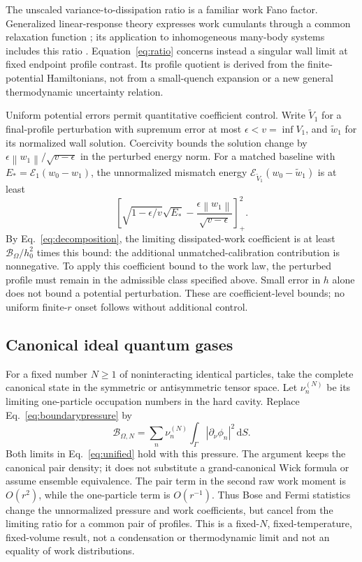 \documentclass[aps,pra,reprint,superscriptaddress,longbibliography]{revtex4-2}
\newcommand{\dd}{\mathrm d}
\newcommand{\calE}{\mathcal E}
\newcommand{\calB}{\mathcal B}
\newcommand{\norm}[1]{\left\lVert#1\right\rVert}
\begin{document}
The unscaled variance-to-dissipation ratio is a familiar work Fano factor. Generalized linear-response theory expresses work cumulants through a common relaxation function \cite{Guarnieri}; its application to inhomogeneous many-body systems includes this ratio \cite{Palamara}. Equation~\eqref{eq:ratio} concerns instead a singular wall limit at fixed endpoint profile contrast. Its profile quotient is derived from the finite-potential Hamiltonians, not from a small-quench expansion or a new general thermodynamic uncertainty relation.

Uniform potential errors permit quantitative coefficient control. Write $\widetilde V_1$ for a final-profile perturbation with supremum error at most $\epsilon<v=\inf V_1$, and $\widetilde w_1$ for its normalized wall solution. Coercivity bounds the solution change by $\epsilon\norm{w_1}/\sqrt{v-\epsilon}$ in the perturbed energy norm. For a matched baseline with $E_* =\calE_1(w_0-w_1)$, the unnormalized mismatch energy $\calE_{\widetilde V_1}(w_0-\widetilde w_1)$ is at least
\begin{equation}
 \left[\sqrt{1-\epsilon/v}\sqrt{E_*}
       -\frac{\epsilon\norm{w_1}}{\sqrt{v-\epsilon}}\right]_+^2.
 \label{eq:robust}
\end{equation}
By Eq.~\eqref{eq:decomposition}, the limiting dissipated-work coefficient is at least $\calB_\Omega/h_0^2$ times this bound: the additional unmatched-calibration contribution is nonnegative. To apply this coefficient bound to the work law, the perturbed profile must remain in the admissible class specified above. Small error in $h$ alone does not bound a potential perturbation. These are coefficient-level bounds; no uniform finite-$r$ onset follows without additional control.

\subsection{Canonical ideal quantum gases}

For a fixed number $N\ge1$ of noninteracting identical particles, take the complete canonical state in the symmetric or antisymmetric tensor space. Let $\nu_n^{(N)}$ be its limiting one-particle occupation numbers in the hard cavity. Replace Eq.~\eqref{eq:boundarypressure} by
\begin{equation}
 \calB_{\Omega,N}=\sum_n\nu_n^{(N)}
                \int_\Gamma|\partial_\nu\phi_n|^2\,\dd S.
 \label{eq:canonicalpressure}
\end{equation}
Both limits in Eq.~\eqref{eq:unified} hold with this pressure. The argument keeps the canonical pair density; it does not substitute a grand-canonical Wick formula or assume ensemble equivalence. The pair term in the second raw work moment is $O(r^2)$, while the one-particle term is $O(r^{-1})$. Thus Bose and Fermi statistics change the unnormalized pressure and work coefficients, but cancel from the limiting ratio for a common pair of profiles. This is a fixed-$N$, fixed-temperature, fixed-volume result, not a condensation or thermodynamic limit and not an equality of work distributions.
\end{document}
